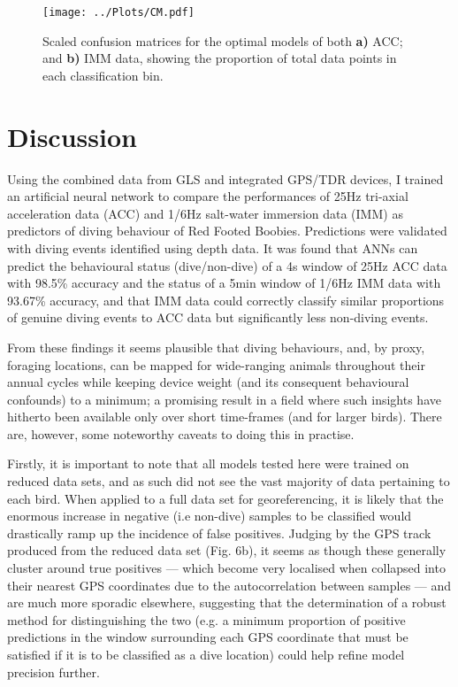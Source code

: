 \documentclass[11pt]{article}
\begin{document}
    
     \begin{figure}[t!]
	    \centering\texttt{[image: ../Plots/CM.pdf]}
	    \caption{Scaled confusion matrices for the optimal models of both \textbf{a)} ACC; and \textbf{b)} IMM data, showing the proportion of total data points in each classification bin.}
    \end{figure}
    
    
    \section{Discussion}
    Using the combined data from GLS and integrated GPS/TDR devices, I trained an artificial neural network to compare the performances of 25Hz tri-axial acceleration data (ACC) and 1/6Hz salt-water immersion data (IMM) as predictors of diving behaviour of Red Footed Boobies. Predictions were validated with diving events identified using depth data. It was found that ANNs can predict the behavioural status (dive/non-dive) of a 4s window of 25Hz ACC data with 98.5\% accuracy and the status of a 5min window of 1/6Hz IMM data with 93.67\% accuracy, and that IMM data could correctly classify similar proportions of genuine diving events to ACC data but significantly less non-diving events. 
    
    From these findings it seems plausible that diving behaviours, and, by proxy, foraging locations, can be mapped for wide-ranging animals throughout their annual cycles while keeping device weight (and its consequent behavioural confounds) to a minimum; a promising result in a field where such insights have hitherto been available only over short time-frames (and for larger birds). There are, however, some noteworthy caveats to doing this in practise.
    
    Firstly, it is important to note that all models tested here were trained on reduced data sets, and as such did not see the vast majority of data pertaining to each bird. When applied to a full data set for georeferencing, it is likely that the enormous increase in negative (i.e non-dive) samples to be classified would drastically ramp up the incidence of false positives. Judging by the GPS track produced from the reduced data set (Fig. 6b), it seems as though these generally cluster around true positives — which become very localised when collapsed into their nearest GPS coordinates due to the autocorrelation between samples — and are much more sporadic elsewhere, suggesting that the determination of a robust method for distinguishing the two (e.g. a minimum proportion of positive predictions in the window surrounding each GPS coordinate that must be satisfied if it is to be classified as a dive location) could help refine model precision further. 
    
\end{document}
